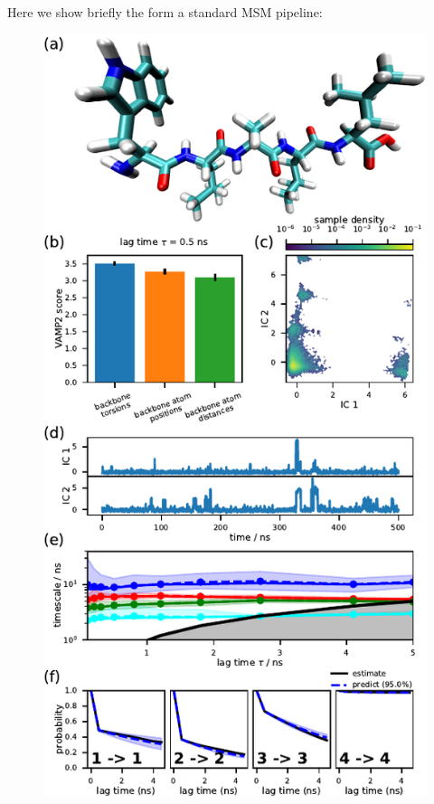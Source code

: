 \documentclass[9pt,tutorial]{livecoms}
\begin{document}
Here we show briefly the form a standard MSM pipeline:

\begin{figure}
\includegraphics{figure_1}

\end{figure}
\end{document}
